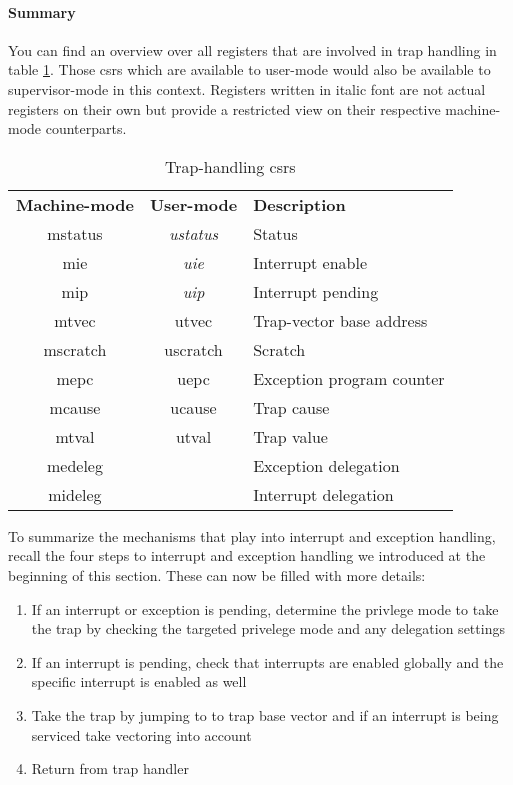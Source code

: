 \paragraph{Summary}
You can find an overview over all registers that are involved in trap handling in table \ref{tbl:trap-csrs}.
Those \glspl{csr} which are available to user-mode would also be available to supervisor-mode in this context.
Registers written in italic font are not actual registers on their own but provide a restricted view on their respective machine-mode counterparts.

\begin{table}
    \centering
    \begin{tabular}{| c c || l |}
        \hline
        \textbf{Machine-mode} & \textbf{User-mode} & \textbf{Description} \\
        \acrshort{mstatus} & \textit{\acrshort{ustatus}} & Status \\
        \acrshort{mie} & \textit{\acrshort{uie}} & Interrupt enable \\
        \acrshort{mip} & \textit{\acrshort{uip}} & Interrupt pending \\
        \acrshort{mtvec} & \acrshort{utvec} & Trap-vector base address \\
        \acrshort{mscratch} & \acrshort{uscratch} & Scratch \\
        \acrshort{mepc} & \acrshort{uepc} & Exception program counter \\
        \acrshort{mcause} & \acrshort{ucause} & Trap cause \\
        \acrshort{mtval} & \acrshort{utval} & Trap value \\
        \acrshort{medeleg} & & Exception delegation \\
        \acrshort{mideleg} & & Interrupt delegation \\
        \hline
    \end{tabular}
    \caption{Trap-handling \glspl{csr}}
    \label{tbl:trap-csrs}
\end{table}

To summarize the mechanisms that play into interrupt and exception handling, recall the four steps to interrupt and exception handling we introduced at the beginning of this section.
These can now be filled with more details:
\begin{enumerate}
    \item If an interrupt or exception is pending, determine the privlege mode to take the trap by checking the targeted privelege mode and any delegation settings
    \item If an interrupt is pending, check that interrupts are enabled globally and the specific interrupt is enabled as well
    \item Take the trap by jumping to to trap base vector and if an interrupt is being serviced take vectoring into account
    \item Return from trap handler
\end{enumerate}


